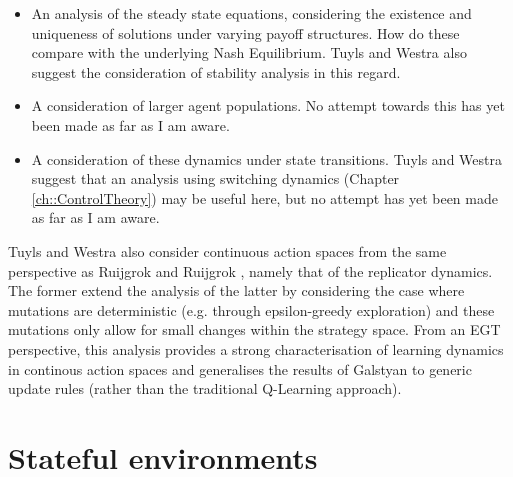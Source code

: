 \documentclass[../sample.tex]{subfiles}
\begin{document}
    \begin{itemize}
        \item  An analysis of the steady state equations, considering the existence and uniqueness
        of solutions under varying payoff structures. How do these compare with the underlying Nash
        Equilibrium. Tuyls and Westra also suggest the consideration of stability analysis in this regard.
        \item A consideration of larger agent populations. No attempt towards this has yet been made
        as far as I am aware.
        \item A consideration of these dynamics under state transitions. Tuyls and Westra suggest
        that an analysis using switching dynamics (Chapter \ref{ch::ControlTheory}) may be useful
        here, but no attempt has yet been made as far as I am aware.
    \end{itemize}

    Tuyls and Westra \cite{TuylesWestra} also consider continuous action spaces from the same
    perspective as Ruijgrok and Ruijgrok \cite{Ruijgrok}, namely that of the replicator dynamics.
    The former extend the analysis of the latter by considering the case where mutations are
    deterministic (e.g. through epsilon-greedy exploration) and these mutations only allow for small
    changes within the strategy space. From an EGT perspective, this analysis provides a strong
    characterisation of learning dynamics in continous action spaces and generalises the results of
    Galstyan to generic update rules (rather than the traditional Q-Learning approach). 

    \section{Stateful environments} \label{sec::Stateful}
\end{document}
